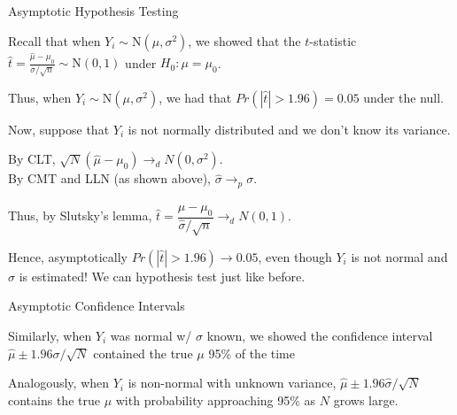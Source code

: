 \documentclass[11pt,english,handout]{beamer}
\newenvironment{wideitemize}{\itemize\addtolength{\itemsep}{10pt}}{\enditemize}
\begin{document}
\begin{frame}{Asymptotic Hypothesis Testing}

\begin{wideitemize}
\item
Recall that when $Y_i \sim \mathrm{N}(\mu,\sigma^2)$, we showed that the $t$-statistic $\hat{t} = \frac{\hat\mu - \mu_0}{\sigma / \sqrt{n}} \sim  \mathrm{N}(0,1)$ under $H_0: \mu = \mu_0$.

\pause
\item 
Thus, when $Y_i \sim \mathrm{N}(\mu,\sigma^2)$, we had that $Pr(|\hat t| > 1.96) = 0.05$ under the null.

\pause
\item
Now, suppose that $Y_i$ is not normally distributed and we don't know its variance.

\pause
\item
By CLT, $\sqrt{N} (\hat\mu - \mu_0) \rightarrow_d N(0,\sigma^2)$.\\
By CMT and LLN (as shown above), $\hat\sigma \rightarrow_p \sigma$. 

\pause
\item
Thus, by Slutsky's lemma, $\hat{t} = \dfrac{\hat\mu - \mu_0}{ \hat\sigma /\sqrt{n} } \rightarrow_d N(0,1)$.

\pause
\item
Hence, asymptotically $Pr( |\hat{t}| > 1.96 ) \rightarrow 0.05$, even though $Y_i$ is not normal and $\hat\sigma$ is estimated! We can hypothesis test just like before.

\end{wideitemize}	
	
\end{frame}


\begin{frame}{Asymptotic Confidence Intervals}

\begin{wideitemize}
\item
Similarly, when $Y_i$ was normal w/ $\sigma$ known, we showed the confidence interval $\hat\mu \pm 1.96 \sigma/\sqrt{N}$ contained the true $\mu$ 95\% of the time

\pause
\item
Analogously, when $Y_i$ is non-normal with unknown variance, $\hat\mu \pm 1.96 \hat\sigma/\sqrt{N}$ contains the true $\mu$ with probability approaching 95\% as $N$ grows large.

\end{wideitemize}
	
\end{frame}
\end{document}
